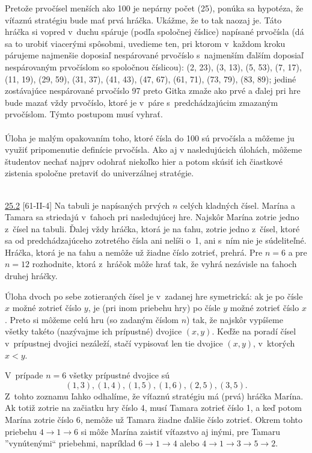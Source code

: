 \rieh Pretože prvočísel menších ako 100 je nepárny počet (25), ponúka sa hypotéza, že víťaznú stratégiu bude mať prvá hráčka. Ukážme, že to tak naozaj je. Táto hráčka si vopred v~duchu spáruje (podľa spoločnej číslice) napísané prvočísla (dá sa to urobiť viacerými spôsobmi, uvedieme ten, pri ktorom v~každom kroku párujeme najmenšie doposiaľ nespárované prvočíslo s~najmenším ďalším doposiaľ nespárovaným prvočíslom so spoločnou číslicou): (2, 23), (3, 13), (5, 53), (7, 17), (11, 19), (29, 59), (31, 37), (41, 43), (47, 67), (61, 71), (73, 79), (83, 89); jediné zostávajúce nespárované prvočíslo 97 preto Gitka zmaže ako prvé a ďalej pri hre bude mazať vždy prvočíslo, ktoré je v~páre s~predchádzajúcim zmazaným prvočíslom. Týmto postupom musí vyhrať.\\
\\
\kom Úloha je malým opakovaním toho, ktoré čísla do 100 sú prvočísla a môžeme ju využiť pripomenutie definície prvočísla. Ako aj v nasledujúcich úlohách, môžeme študentov nechať najprv odohrať niekoľko hier a potom skúsiť ich čiastkové zistenia spoločne pretaviť do univerzálnej stratégie.\\
\\
\begin{tcolorbox}[breakable,notitle,boxrule=0pt,colback=light-gray,colframe=light-gray]\ul{25.2} [61-II-4] Na tabuli je napísaných prvých $n$ celých kladných čísel. Marína a Tamara sa striedajú v~ťahoch pri nasledujúcej hre. Najskôr Marína zotrie jedno z~čísel na tabuli. Ďalej vždy hráčka, ktorá je na ťahu, zotrie jedno z~čísel, ktoré sa od predchádzajúceho zotretého čísla ani nelíši o~1, ani s~ním nie je súdeliteľné. Hráčka, ktorá je na ťahu a nemôže už žiadne číslo zotrieť, prehrá. Pre $n = 6$ a pre $n = 12$ rozhodnite, ktorá z~hráčok môže hrať tak, že vyhrá nezávisle na ťahoch druhej hráčky.

\end{tcolorbox}

\rieh Úloha dvoch po sebe zotieraných čísel je v~zadanej hre symetrická: ak je po čísle $x$ možné zotrieť číslo $y$, je (pri inom priebehu hry) po čísle $y$ možné zotrieť číslo $x$. Preto si môžeme celú hru (so zadaným číslom $n$)  tak, že najskôr vypíšeme všetky takéto (nazývajme ich prípustné) dvojice $(x, y)$. Keďže na poradí čísel v~prípustnej dvojici nezáleží, stačí vypisovať len tie dvojice $(x, y)$, v~ktorých $x < y$.

V~prípade $n = 6$ všetky prípustné dvojice sú
$$(1, 3), (1, 4), (1, 5), (1, 6), (2, 5), (3, 5).$$
Z~tohto zoznamu ľahko odhalíme, že víťaznú stratégiu má (prvá) hráčka Marína. Ak totiž zotrie na začiatku hry číslo 4, musí Tamara zotrieť číslo 1, a keď potom Marína zotrie číslo 6, nemôže už Tamara žiadne ďalšie číslo zotrieť. Okrem tohto priebehu $4 \rightarrow 1\rightarrow 6$ si môže Marína zaistiť víťazstvo aj inými, pre Tamaru ”vynútenými“ priebehmi, napríklad $6\rightarrow 1 \rightarrow 4$ alebo $4 \rightarrow 1 \rightarrow 3 \rightarrow 5 \rightarrow 2$.

